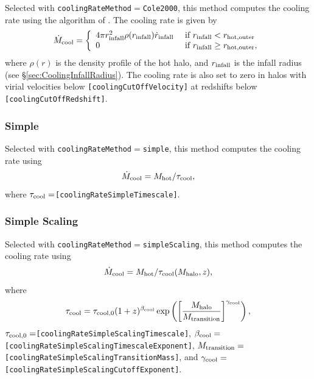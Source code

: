 Selected with {\tt coolingRateMethod}$=${\tt Cole2000}, this method computes the cooling rate using the algorithm of \cite{cole_hierarchical_2000}. The cooling rate is given by
\begin{equation}
\dot{M}_{\rm cool} = \left\{ \begin{array}{ll} 4 \pi r_{\rm infall}^2 \rho(r_{\rm infall}) \dot{r}_{\rm infall} & \hbox{ if } r_{\rm infall} < r_{\rm hot, outer} \\ 0 & \hbox{ if } r_{\rm infall} \ge r_{\rm hot, outer}, \end{array} \right.
\end{equation}
where $\rho(r)$ is the density profile of the hot halo, and $r_{\rm infall}$ is the infall radius (see \S\ref{sec:CoolingInfallRadius}). The cooling rate is also set to zero in halos with virial velocities below {\tt [coolingCutOffVelocity]} at redshifts below {\tt [coolingCutOffRedshift]}.

\subsubsection{Simple}

Selected with {\tt coolingRateMethod}$=${\tt simple}, this method computes the cooling rate using
\begin{equation}
\dot{M}_{\rm cool} = M_{\rm hot}/\tau_{\rm cool} ,
\end{equation}
where $\tau_{\rm cool}=${\tt [coolingRateSimpleTimescale]}.

\subsubsection{Simple Scaling}

Selected with {\tt coolingRateMethod}$=${\tt simpleScaling}, this method computes the cooling rate using
\begin{equation}
\dot{M}_{\rm cool} = M_{\rm hot}/\tau_{\rm cool}(M_{\rm halo},z) ,
\end{equation}
where 
\begin{equation}
\tau_{\rm cool}=\tau_{\rm cool,0} (1+z)^{\beta_{\rm cool}} \exp \left(\left[{M_{\rm halo} \over M_{\rm transition}}\right]^{\gamma_{\rm cool}}\right),
\end{equation}
$\tau_{\rm cool,0}=${\tt [coolingRateSimpleScalingTimescale]}, $\beta_{\rm cool}=${\tt [coolingRateSimpleScalingTimescaleExponent]}, $M_{\rm transition}=${\tt [coolingRateSimpleScalingTransitionMass]}, and $\gamma_{\rm cool}=${\tt [coolingRateSimpleScalingCutoffExponent]}.

